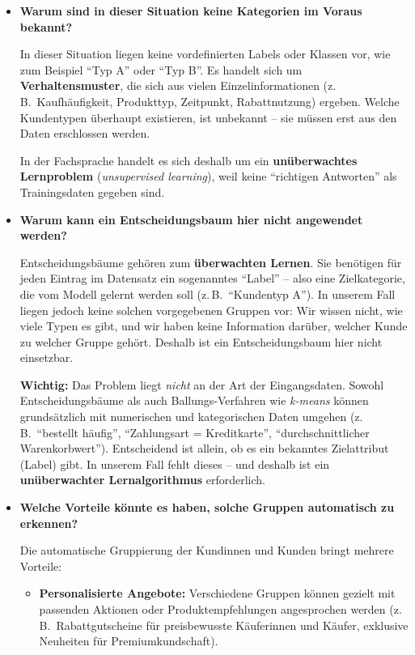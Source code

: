 \begin{aufgabe}{1}
\begin{itemize}
  \item \textbf{Warum sind in dieser Situation keine Kategorien im Voraus bekannt?}

    In dieser Situation liegen keine vordefinierten Labels oder Klassen vor, wie zum Beispiel ``Typ A'' oder ``Typ B''. Es handelt sich um \textbf{Verhaltensmuster}, die sich aus vielen Einzelinformationen (z.\,B.\ Kaufhäufigkeit, Produkttyp, Zeitpunkt, Rabattnutzung) ergeben. Welche Kundentypen überhaupt existieren, ist unbekannt – sie müssen erst aus den Daten erschlossen werden.

    In der Fachsprache handelt es sich deshalb um ein \textbf{unüberwachtes Lernproblem} (\textit{unsupervised learning}), weil keine ``richtigen Antworten'' als Trainingsdaten gegeben sind.

  \item \textbf{Warum kann ein Entscheidungsbaum hier nicht angewendet werden?}

Entscheidungsbäume gehören zum \textbf{überwachten Lernen}. Sie benötigen für jeden Eintrag im Datensatz ein sogenanntes ``Label'' – also eine Zielkategorie, die vom Modell gelernt werden soll (z.\,B.\ ``Kundentyp A''). In unserem Fall liegen jedoch keine solchen vorgegebenen Gruppen vor: Wir wissen nicht, wie viele Typen es gibt, und wir haben keine Information darüber, welcher Kunde zu welcher Gruppe gehört. Deshalb ist ein Entscheidungsbaum hier nicht einsetzbar.

\textbf{Wichtig:} Das Problem liegt \emph{nicht} an der Art der Eingangsdaten. Sowohl Entscheidungsbäume als auch Ballungs-Verfahren wie \textit{k-means} können grundsätzlich mit numerischen und kategorischen Daten umgehen (z.\,B.\ ``bestellt häufig'', ``Zahlungsart = Kreditkarte'', ``durchschnittlicher Warenkorbwert''). Entscheidend ist allein, ob es ein bekanntes Zielattribut (Label) gibt. In unserem Fall fehlt dieses – und deshalb ist ein \textbf{unüberwachter Lernalgorithmus} erforderlich.


  \item \textbf{Welche Vorteile könnte es haben, solche Gruppen automatisch zu erkennen?}

    Die automatische Gruppierung der Kundinnen und Kunden bringt mehrere Vorteile:
    \begin{itemize}
  \item \textbf{Personalisierte Angebote:} Verschiedene Gruppen können gezielt mit passenden Aktionen oder Produktempfehlungen angesprochen werden (z.\,B.\ Rabattgutscheine für preisbewusste Käuferinnen und Käufer, exklusive Neuheiten für Premiumkundschaft).


\end{itemize}
\end{itemize}
\end{aufgabe}
